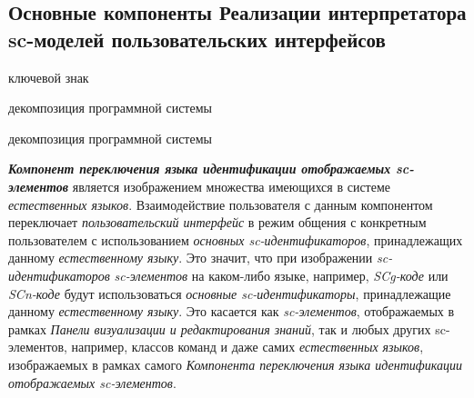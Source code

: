 \subsection{Основные компоненты Реализации интерпретатора sc-моделей пользовательских интерфейсов}
\label{sec_soft_platform_sci_machine_components}

\begin{SCn}

\begin{scnrelfromlist}{ключевой знак}
\end{scnrelfromlist}
	
\end{SCn}

\begin{SCn}
\begin{scnrelfromset}{декомпозиция программной системы}
	\begin{scnindent}
		\begin{scnrelfromset}{декомпозиция программной системы}
		\end{scnrelfromset}
	\end{scnindent}
\end{scnrelfromset}
\end{SCn}

\textbf{\textit{Компонент переключения языка идентификации отображаемых sc-элементов}} является изображением множества имеющихся в системе \textit{естественных языков}. Взаимодействие пользователя с данным компонентом переключает \textit{пользовательский интерфейс} в режим общения с конкретным пользователем с использованием \textit{основных sc-идентификаторов}, принадлежащих данному \textit{естественному языку}. Это значит, что при изображении \textit{sc-идентификаторов} \textit{sc-элементов} на каком-либо языке, например, \textit{SCg-коде} или \textit{SCn-коде} будут использоваться \textit{основные sc-идентификаторы}, принадлежащие данному \textit{естественному языку}. Это касается как \textit{sc-элементов}, отображаемых в рамках \textit{Панели визуализации и редактирования знаний}, так и любых других sc-элементов, например, классов команд и даже самих \textit{естественных языков}, изображаемых в рамках самого \textit{Компонента переключения языка идентификации отображаемых sc-элементов}.

